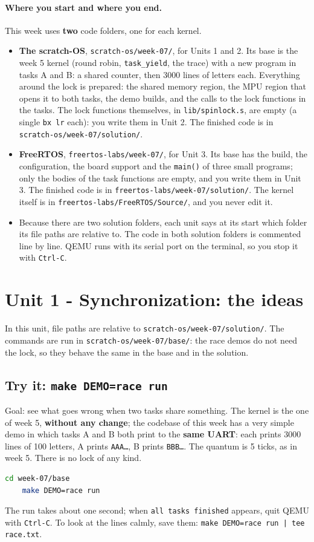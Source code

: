 \paragraph{Where you start and where you end.} This week uses \textbf{two} code folders, one for each kernel.
\begin{itemize}
    \item \textbf{The scratch-OS}, \texttt{scratch-os/week-07/}, for Units 1 and 2. Its base is the week 5 kernel (round robin, \texttt{task\_yield}, the trace) with a new program in tasks A and B: a shared counter, then 3000 lines of letters each. Everything around the lock is prepared: the shared memory region, the MPU region that opens it to both tasks, the demo builds, and the calls to the lock functions in the tasks. The lock functions themselves, in \texttt{lib/spinlock.s}, are empty (a single \texttt{bx lr} each): you write them in Unit 2. The finished code is in \texttt{scratch-os/week-07/solution/}.
    \item \textbf{FreeRTOS}, \texttt{freertos-labs/week-07/}, for Unit 3. Its base has the build, the configuration, the board support and the \texttt{main()} of three small programs; only the bodies of the task functions are empty, and you write them in Unit 3. The finished code is in \texttt{freertos-labs/week-07/solution/}. The kernel itself is in \texttt{freertos-labs/FreeRTOS/Source/}, and you never edit it.
    \item Because there are two solution folders, each unit says at its start which folder its file paths are relative to. The code in both solution folders is commented line by line. QEMU runs with its serial port on the terminal, so you stop it with \texttt{Ctrl-C}.
\end{itemize}

\section{Unit 1 - Synchronization: the ideas}
In this unit, file paths are relative to \texttt{scratch-os/week-07/solution/}. The commands are run in \texttt{scratch-os/week-07/base/}: the race demos do not need the lock, so they behave the same in the base and in the solution.

\subsection{Try it: \texttt{make DEMO=race run}}
Goal: see what goes wrong when two tasks share something. The kernel is the one of week 5, \textbf{without any change}; the codebase of this week has a very simple demo in which tasks A and B both print to the \textbf{same UART}: each prints 3000 lines of 100 letters, A prints \texttt{AAA\ldots}, B prints \texttt{BBB\ldots}. The quantum is 5 ticks, as in week 5. There is no lock of any kind.
\begin{lstlisting}[language=bash]
    cd week-07/base
    make DEMO=race run
\end{lstlisting}
The run takes about one second; when \texttt{all tasks finished} appears, quit QEMU with \texttt{Ctrl-C}. To look at the lines calmly, save them: \texttt{make DEMO=race run | tee race.txt}.

